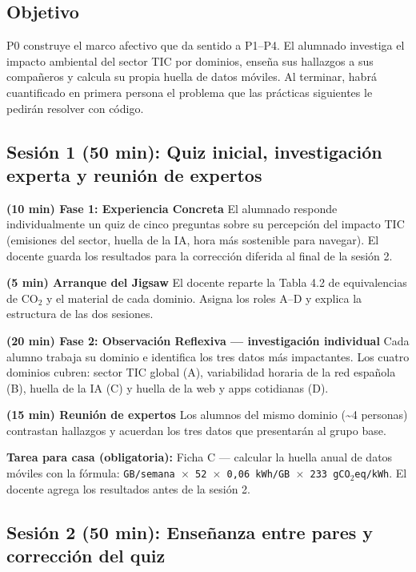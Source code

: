 \subsection{Objetivo}


P0 construye el marco afectivo que da sentido a P1–P4. El alumnado investiga el impacto ambiental del sector TIC por dominios, enseña sus hallazgos a sus compañeros y calcula su propia huella de datos móviles. Al terminar, habrá cuantificado en primera persona el problema que las prácticas siguientes le pedirán resolver con código.


\subsection{Sesión 1 (50 min): Quiz inicial, investigación experta y reunión de expertos}


\textbf{(10 min) Fase 1: Experiencia Concreta} El alumnado responde individualmente un quiz de cinco preguntas sobre su percepción del impacto TIC (emisiones del sector, huella de la IA, hora más sostenible para navegar). El docente guarda los resultados para la corrección diferida al final de la sesión 2.


\textbf{(5 min) Arranque del Jigsaw} El docente reparte la Tabla 4.2 de equivalencias de CO$_2$ y el material de cada dominio. Asigna los roles A–D y explica la estructura de las dos sesiones.


\textbf{(20 min) Fase 2: Observación Reflexiva — investigación individual} Cada alumno trabaja su dominio e identifica los tres datos más impactantes. Los cuatro dominios cubren: sector TIC global (A), variabilidad horaria de la red española (B), huella de la IA (C) y huella de la web y apps cotidianas (D).


\textbf{(15 min) Reunión de expertos} Los alumnos del mismo dominio (\textasciitilde{}4 personas) contrastan hallazgos y acuerdan los tres datos que presentarán al grupo base.


\textbf{Tarea para casa (obligatoria):} Ficha C — calcular la huella anual de datos móviles con la fórmula: \texttt{GB/semana $\times$ 52 $\times$ 0,06 kWh/GB $\times$ 233 gCO$_2$eq/kWh}. El docente agrega los resultados antes de la sesión 2.




\subsection{Sesión 2 (50 min): Enseñanza entre pares y corrección del quiz}


